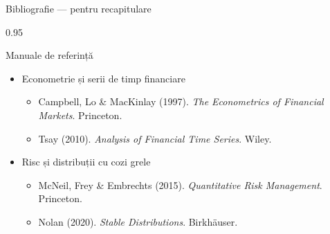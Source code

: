 \documentclass[9pt, aspectratio=169, t]{beamer}
\begin{document}
\begin{frame}[shrink=55]{Bibliografie --- pentru recapitulare}
\begin{cminipage}{0.95\textwidth}
\begin{block}{Manuale de referință}
\begin{itemize}\setlength{\itemsep}{0pt}
    \item Econometrie și serii de timp financiare
    \begin{itemize}\setlength{\itemsep}{0pt}
        \item Campbell, Lo \& MacKinlay (1997). \textit{The Econometrics of Financial Markets}. Princeton.
        \item Tsay (2010). \textit{Analysis of Financial Time Series}. Wiley.
    \end{itemize}
    \item Risc și distribuții cu cozi grele
    \begin{itemize}\setlength{\itemsep}{0pt}
        \item McNeil, Frey \& Embrechts (2015). \textit{Quantitative Risk Management}. Princeton.
        \item Nolan (2020). \textit{Stable Distributions}. Birkhäuser.
    \end{itemize}
\end{itemize}
\end{block}


\end{cminipage}
\end{frame}
\end{document}
